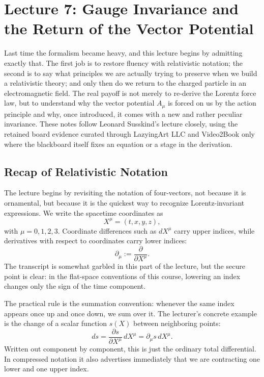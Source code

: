 \chapter{Lecture 7: Gauge Invariance and the Return of the Vector Potential}

Last time the formalism became heavy, and this lecture begins by admitting exactly that. The first job is to restore fluency with relativistic notation; the second is to say what principles we are actually trying to preserve when we build a relativistic theory; and only then do we return to the charged particle in an electromagnetic field. The real payoff is not merely to re-derive the Lorentz force law, but to understand why the vector potential \(A_\mu\) is forced on us by the action principle and why, once introduced, it comes with a new and rather peculiar invariance. These notes follow Leonard Susskind's lecture closely, using the retained board evidence curated through LazyingArt LLC and Video2Book only where the blackboard itself fixes an equation or a stage in the derivation.

\section{Recap of Relativistic Notation}

The lecture begins by revisiting the notation of four-vectors, not because it is ornamental, but because it is the quickest way to recognize Lorentz-invariant expressions. We write the spacetime coordinates as
\begin{equation}
X^\mu = (t,x,y,z),
\end{equation}
with \(\mu=0,1,2,3\). Coordinate differences such as \(dX^\mu\) carry upper indices, while derivatives with respect to coordinates carry lower indices:
\begin{equation}
\partial_\mu := \frac{\partial}{\partial X^\mu}.
\end{equation}
The transcript is somewhat garbled in this part of the lecture, but the secure point is clear: in the flat-space conventions of this course, lowering an index changes only the sign of the time component.

The practical rule is the summation convention: whenever the same index appears once up and once down, we sum over it. The lecturer's concrete example is the change of a scalar function \(s(X)\) between neighboring points:
\begin{equation}
ds = \frac{\partial s}{\partial X^\mu}\,dX^\mu = \partial_\mu s\, dX^\mu.
\end{equation}
Written out component by component, this is just the ordinary total differential. In compressed notation it also advertises immediately that we are contracting one lower and one upper index.

